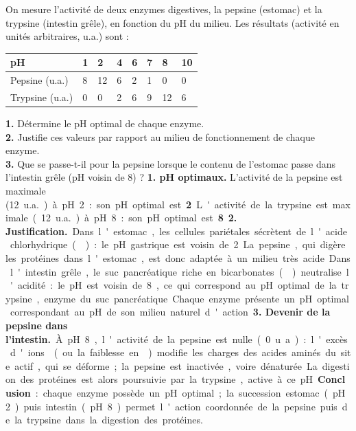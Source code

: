 \documentclass[11pt]{article}
\begin{document}
\begin{exoresolu}
On mesure l'activité de deux enzymes digestives, la pepsine (estomac) et la trypsine (intestin grêle), en fonction du pH du milieu. Les résultats (activité en unités arbitraires, u.a.) sont :

\begin{center}
\begin{tabularx}{\linewidth}{|l|X|X|X|X|X|X|X|}\hline
\rowcolor{popblueL}
pH & 1 & 2 & 4 & 6 & 7 & 8 & 10 \\ \hline
Pepsine (u.a.) & 8 & 12 & 6 & 2 & 1 & 0 & 0 \\ \hline
Trypsine (u.a.) & 0 & 0 & 2 & 6 & 9 & 12 & 6 \\ \hline
\end{tabularx}
\end{center}

\textbf{1.} Détermine le pH optimal de chaque enzyme.\\
\textbf{2.} Justifie ces valeurs par rapport au milieu de fonctionnement de chaque enzyme.\\
\textbf{3.} Que se passe-t-il pour la pepsine lorsque le contenu de l'estomac passe dans l'intestin grêle (pH voisin de 8) ?
\tcblower
\textbf{1. pH optimaux.} L'activité de la pepsine est maximale (\SI{12}{u.a.}) à pH 2 : son pH optimal est \textbf{2}. L'activité de la trypsine est maximale (\SI{12}{u.a.}) à pH 8 : son pH optimal est \textbf{8}.

\textbf{2. Justification.} Dans l'estomac, les cellules pariétales sécrètent de l'acide chlorhydrique () : le pH gastrique est voisin de 2. La pepsine, qui digère les protéines dans l'estomac, est donc adaptée à un milieu très acide. Dans l'intestin grêle, le suc pancréatique riche en bicarbonates () neutralise l'acidité : le pH est voisin de 8, ce qui correspond au pH optimal de la trypsine, enzyme du suc pancréatique. Chaque enzyme présente un pH optimal correspondant au pH de son milieu naturel d'action.

\textbf{3. Devenir de la pepsine dans l'intestin.} À pH 8, l'activité de la pepsine est nulle (0 u.a.) : l'excès d'ions  (ou la faiblesse en ) modifie les charges des acides aminés du site actif, qui se déforme ; la pepsine est inactivée, voire dénaturée. La digestion des protéines est alors poursuivie par la trypsine, active à ce pH.

\textbf{Conclusion} : chaque enzyme possède un pH optimal ; la succession estomac (pH 2) puis intestin (pH 8) permet l'action coordonnée de la pepsine puis de la trypsine dans la digestion des protéines.
\end{exoresolu}
\end{document}

